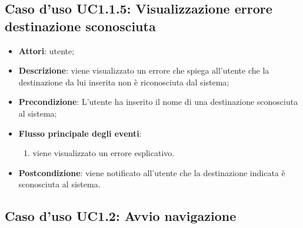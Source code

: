 \documentclass[../AnalisiDeiRequisiti.tex]{subfiles}
\begin{document}
\subsection{Caso d'uso UC1.1.5: Visualizzazione errore destinazione sconosciuta}
\begin{itemize}
	\item \textbf{Attori}: utente;
	\item \textbf{Descrizione}: viene visualizzato un errore che spiega all'utente che la destinazione da lui inserita non è riconosciuta dal sistema; 
	\item \textbf{Precondizione}: L'utente ha inserito il nome di una destinazione sconosciuta al sistema;
	
	\item \textbf{Flusso principale degli eventi}:
	\begin{enumerate}
		\item viene visualizzato un errore esplicativo.
		
	\end{enumerate}
	\item \textbf{Postcondizione}: viene notificato all'utente che la destinazione indicata è sconosciuta al sistema.
\end{itemize}
\hypertarget{UC1.2}{}
\subsection{Caso d'uso UC1.2: Avvio navigazione}
\end{document}
